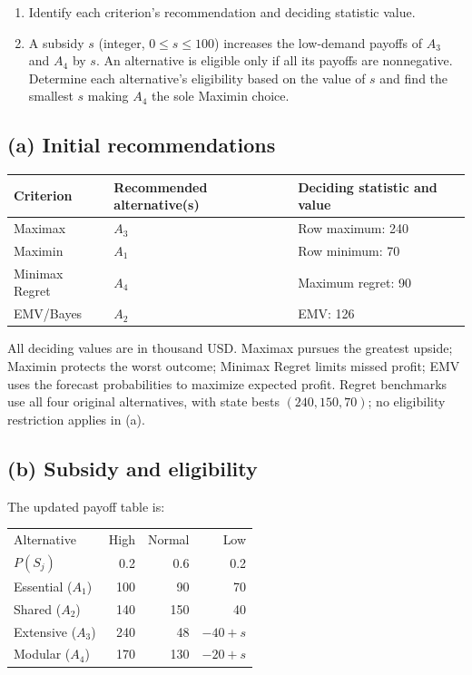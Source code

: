 \begin{enumerate}[label=\textbf{(\alph*)},leftmargin=*]
	\item Identify each criterion's recommendation and deciding statistic value. 

	\item A subsidy $s$ (integer, $0\leq s\leq100$) increases the low-demand payoffs of $A_3$ and $A_4$ by $s$. An alternative is eligible only if all its payoffs are nonnegative. Determine each alternative's eligibility based on the value of $s$ and find the smallest $s$ making $A_4$ the sole Maximin choice.
\end{enumerate}
\label{sol:q1a}
\subsection*{(a) Initial recommendations }
\begin{center}
\begin{tabular}{lll}\toprule
Criterion & Recommended alternative(s) & Deciding statistic and value\\ \midrule
Maximax & $A_3$ & Row maximum: 240\\
Maximin & $A_1$ & Row minimum: 70\\
Minimax Regret & $A_4$ & Maximum regret: 90\\
EMV/Bayes & $A_2$ & EMV: 126\\
\bottomrule\end{tabular}
\end{center}
All deciding values are in thousand USD. Maximax pursues the greatest upside; Maximin protects the worst outcome; Minimax Regret limits missed profit; EMV uses the forecast probabilities to maximize expected profit. Regret benchmarks use all four original alternatives, with state bests $(240,150,70)$; no eligibility restriction applies in (a).
\secInicio[sec:q1]


\label{sol:q1b}
\subsection*{(b) Subsidy and eligibility }

The updated payoff table is:

\begin{center}\small\setlength{\tabcolsep}{4pt}
	\begin{tabular}{lrrr}\toprule
		Alternative & High & Normal & Low\\
		$P(S_j)$ & 0.2 & 0.6 & 0.2\\ \midrule
		Essential ($A_1$) & 100 & 90 & 70\\
		Shared ($A_2$) & 140 & 150 & 40\\
		Extensive ($A_3$) & 240 & 48 & $-40+s$\\
		Modular ($A_4$) & 170 & 130 & $-20+s$\\
		\bottomrule
	\end{tabular}
\end{center}

